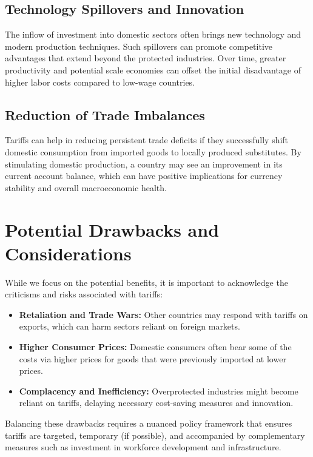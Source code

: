 \documentclass[12pt]{article}
\begin{document}
\subsection{Technology Spillovers and Innovation}
The inflow of investment into domestic sectors often brings new technology and modern production techniques. Such spillovers can promote competitive advantages that extend beyond the protected industries. Over time, greater productivity and potential scale economies can offset the initial disadvantage of higher labor costs compared to low-wage countries.

\subsection{Reduction of Trade Imbalances}
Tariffs can help in reducing persistent trade deficits if they successfully shift domestic consumption from imported goods to locally produced substitutes. By stimulating domestic production, a country may see an improvement in its current account balance, which can have positive implications for currency stability and overall macroeconomic health.

\section{Potential Drawbacks and Considerations}
While we focus on the potential benefits, it is important to acknowledge the criticisms and risks associated with tariffs:
\begin{itemize}
    \item \textbf{Retaliation and Trade Wars:} Other countries may respond with tariffs on exports, which can harm sectors reliant on foreign markets.
    \item \textbf{Higher Consumer Prices:} Domestic consumers often bear some of the costs via higher prices for goods that were previously imported at lower prices.
    \item \textbf{Complacency and Inefficiency:} Overprotected industries might become reliant on tariffs, delaying necessary cost-saving measures and innovation.
\end{itemize}
Balancing these drawbacks requires a nuanced policy framework that ensures tariffs are targeted, temporary (if possible), and accompanied by complementary measures such as investment in workforce development and infrastructure.
\end{document}
